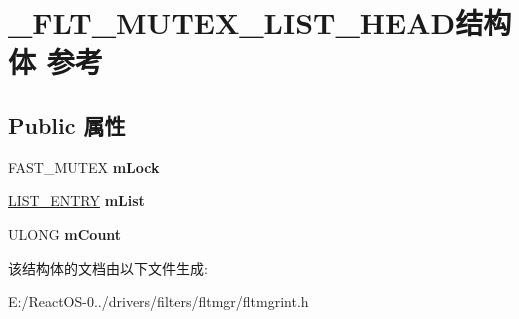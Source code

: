 \hypertarget{struct___f_l_t___m_u_t_e_x___l_i_s_t___h_e_a_d}{}\section{\+\_\+\+F\+L\+T\+\_\+\+M\+U\+T\+E\+X\+\_\+\+L\+I\+S\+T\+\_\+\+H\+E\+A\+D结构体 参考}
\label{struct___f_l_t___m_u_t_e_x___l_i_s_t___h_e_a_d}
\subsection*{Public 属性}
\begin{DoxyCompactItemize}
\item 
\mbox{\label{struct___f_l_t___m_u_t_e_x___l_i_s_t___h_e_a_d_af7bf51523ec26a8aa34b25c1086c7bf8}} 
F\+A\+S\+T\+\_\+\+M\+U\+T\+EX {\bfseries m\+Lock}
\item 
\mbox{\label{struct___f_l_t___m_u_t_e_x___l_i_s_t___h_e_a_d_aabfab3a223a6fb47a375436e527abd60}} 
\hyperlink{struct___l_i_s_t___e_n_t_r_y}{L\+I\+S\+T\+\_\+\+E\+N\+T\+RY} {\bfseries m\+List}
\item 
\mbox{\label{struct___f_l_t___m_u_t_e_x___l_i_s_t___h_e_a_d_a615e23922da0b266c124b525980578ae}} 
U\+L\+O\+NG {\bfseries m\+Count}
\end{DoxyCompactItemize}


该结构体的文档由以下文件生成\+:\begin{DoxyCompactItemize}
\item 
E\+:/\+React\+O\+S-\/0../drivers/filters/fltmgr/fltmgrint.\+h\end{DoxyCompactItemize}
